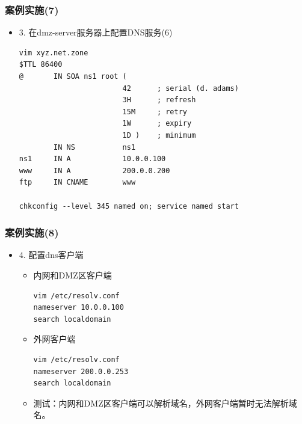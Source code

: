 \documentclass[xcolor=svgnames,presentation]{beamer}
\begin{document}
\begin{frame}[fragile]
\frametitle{案例实施(7)}
\label{sec-5-9}
\begin{itemize}

\item 3. 在dmz-server服务器上配置DNS服务(6)\\
\label{sec-5-9-1}%
\begin{verbatim}
vim xyz.net.zone
$TTL 86400
@       IN SOA ns1 root (
                        42      ; serial (d. adams)
                        3H      ; refresh
                        15M     ; retry
                        1W      ; expiry
                        1D )    ; minimum
        IN NS           ns1
ns1     IN A            10.0.0.100
www     IN A            200.0.0.200
ftp     IN CNAME        www

chkconfig --level 345 named on; service named start
\end{verbatim}
\end{itemize} %
\end{frame}
\begin{frame}[fragile]
\frametitle{案例实施(8)}
\label{sec-5-10}
\begin{itemize}

\item 4. 配置dns客户端
\label{sec-5-10-1}%
\begin{itemize}

\item 内网和DMZ区客户端\\
\label{sec-5-10-1-1}%
\begin{verbatim}
vim /etc/resolv.conf
nameserver 10.0.0.100
search localdomain
\end{verbatim}

\item 外网客户端\\
\label{sec-5-10-1-2}%
\begin{verbatim}
vim /etc/resolv.conf
nameserver 200.0.0.253
search localdomain
\end{verbatim}

\item 测试：内网和DMZ区客户端可以解析域名，外网客户端暂时无法解析域名。
\label{sec-5-10-1-3}%
\end{itemize} %
\end{itemize} %
\end{frame}
\end{document}
